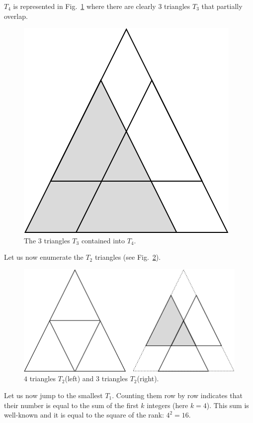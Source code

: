 \begin{itemize}
\begin{enumerate}
$T_4$ is represented in Fig.~\ref{fig:countingTriangles3} where there are clearly $3$ triangles $T_3$
that partially overlap.
\begin{figure}[h]
\begin{center}
        \includegraphics[scale=0.3]{FiguresArithmetic/CountingTriangles3} 
        \caption{The $3$ triangles $T_3$ contained into $T_4$.}
        \label{fig:countingTriangles3}
\end{center}
\end{figure}
Let us now enumerate the $T_2$ triangles
(see Fig.~\ref{fig:countingTriangles2}).
\begin{figure}[h]
\begin{center}
        \includegraphics[scale=0.3]{FiguresArithmetic/CountingTriangles2} 
        \caption{$4$ triangles $T_2$(left) and $3$ triangles $T_2$(right).}
        \label{fig:countingTriangles2}
\end{center}
\end{figure}
Let us now jump to the smallest $T_1$.
Counting them row by row indicates that their number is equal to the sum of the first $k$ integers (here $k=4$).
This sum is well-known and it is equal to the square of the rank: $4^2 = 16$.
\smallskip


\end{enumerate}
\end{itemize}
